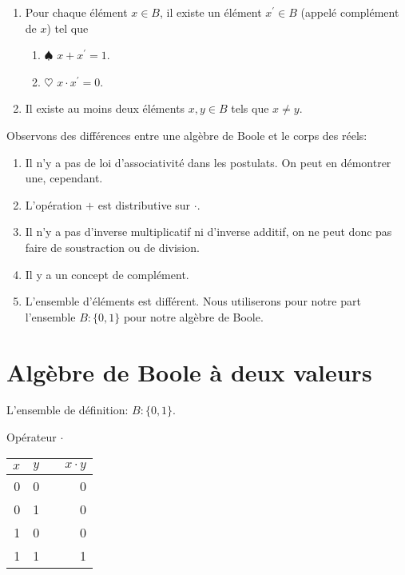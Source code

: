 \documentclass[letter, oneside]{book}
\begin{document}
\begin{enumerate}
\item Pour chaque élément \(x \in B\), il existe un élément
\(x^{\prime} \in B\) (appelé complément de \(x\)) tel que

\begin{enumerate}
\item \(\spadesuit\) \(x + x^{\prime} = 1\).

\item \(\heartsuit\) \(x \cdot x^{\prime} = 0\).
\end{enumerate}

\item Il existe au moins deux éléments \(x, y \in B\) tels que \(x \neq y\).
\end{enumerate}

Observons des différences entre une algèbre de Boole et le corps des réels:

\begin{enumerate}
\item Il n'y a pas de loi d'associativité dans les postulats. On peut en
démontrer une, cependant.

\item L'opération \(+\) est distributive sur \(\cdot\).

\item Il n'y a pas d'inverse multiplicatif ni d'inverse additif, on ne
peut donc pas faire de soustraction ou de division.

\item Il y a un concept de complément.

\item L'ensemble d'éléments est différent. Nous utiliserons pour notre
part l'ensemble \(B: \{0, 1 \}\) pour notre algèbre de Boole.
\end{enumerate}

\section{Algèbre de Boole à deux valeurs}
\label{sec:orgdb00d9f}

L'ensemble de définition: \(B : \{0, 1 \}\).

Opérateur \(\cdot\)

\begin{center}
\begin{tabular}{rrlr}
\(x\) & \(y\) &  & \(x \cdot y\)\\[0pt]
\hline
0 & 0 &  & 0\\[0pt]
0 & 1 &  & 0\\[0pt]
1 & 0 &  & 0\\[0pt]
1 & 1 &  & 1\\[0pt]
\end{tabular}
\end{center}
\end{document}
